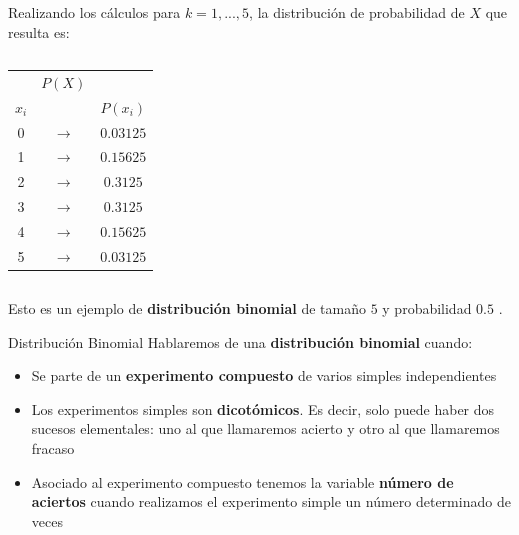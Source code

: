 \documentclass[11pt,handout]{beamer}
\begin{document}
\begin{frame}{}
Realizando los cálculos para $k = 1,...,5 $, la distribución de probabilidad de $X$ que resulta es:
\begin{columns}
\begin{column}{0.3\textwidth}
\begin{center}
\begin{tabular}{ccc}
 & $P(X)$ &  \\
$x_i$ &  &  $P(x_i)$\\ \hline 
0 & $\rightarrow$ & $0.03125$ \\ 
1 & $\rightarrow$ & $0.15625$ \\ 
2 & $\rightarrow$ & $0.3125$ \\ 
3 & $\rightarrow$ & $0.3125$ \\ 
4 & $\rightarrow$ & $0.15625$ \\ 
5 & $\rightarrow$ & $0.03125$ \\ 
\end{tabular} 
\end{center}
\end{column}
\begin{column}{0.7\textwidth}
\begin{center}
\end{center}
\end{column}

\end{columns}
\pause
Esto es un ejemplo de \textbf{distribución binomial} de tamaño $5$ y probabilidad $0.5$ .
\end{frame}



\begin{frame}{Distribución Binomial}
Hablaremos de una \textbf{distribución binomial} cuando:
\begin{itemize}[<+->]
\item Se parte de un \textbf{experimento compuesto} de varios simples independientes
\item Los experimentos simples son \textbf{dicotómicos}. Es decir, solo puede haber dos sucesos elementales: uno al que llamaremos acierto y otro al que llamaremos fracaso
\item Asociado al experimento compuesto tenemos la variable \textbf{número de aciertos} cuando realizamos el experimento simple un número determinado de veces
\end{itemize}
\end{frame}
\end{document}

